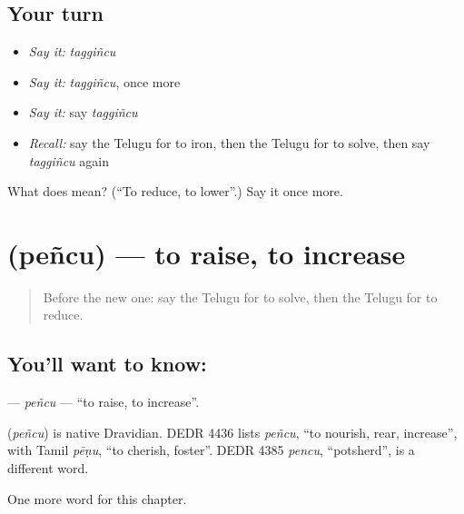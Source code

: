 \subsection*{Your turn}
\begin{itemize}
\raggedright
  \item \emph{Say it:} \emph{taggiñcu}
  \item \emph{Say it:} \emph{taggiñcu}, once more
  \item \emph{Say it:} say \emph{taggiñcu}
  \item \emph{Recall:} say the Telugu for to iron, then the Telugu for to solve, then say \emph{taggiñcu} again
\end{itemize}

\begin{tcolorbox}[breakable,colback=teal!4,colframe=teal!35!black,title={Before you move on}]
What does  mean? (\textquotedblleft{}To reduce, to lower\textquotedblright{}.) Say it once more.
\end{tcolorbox}
\section[\texorpdfstring{\te{పెంచు} (peñcu)}{పెంచు (peñcu)}]{ (peñcu) — to raise, to increase}

\label{lesson:TE-C243-pencu}



\begin{quote}
Before the new one: say the Telugu for to solve, then the Telugu for to reduce.
\end{quote}

\subsection*{You'll want to know: }
\textbf{} — \emph{peñcu} — \textquotedblleft{}to raise, to increase\textquotedblright{}.

\begin{cousinweb}
\textbf{} (\emph{peñcu}) is native Dravidian. DEDR 4436 lists \emph{peñcu}, \textquotedblleft{}to nourish, rear, increase\textquotedblright{}, with Tamil \emph{pēṇu}, \textquotedblleft{}to cherish, foster\textquotedblright{}. DEDR 4385 \emph{pencu}, \textquotedblleft{}potsherd\textquotedblright{}, is a different word.
\end{cousinweb}

\begin{grammarlens}[title={What you've built}]
One more word for this chapter.
\end{grammarlens}

